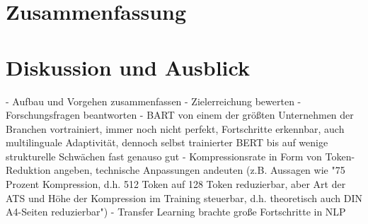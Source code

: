 \chapter{Zusammenfassung}
\thispagestyle{fancy}
\label{chap:Zusammenfassung}

\chapter{Diskussion und Ausblick}
\thispagestyle{fancy}
\label{chap:Diskussion und Ausblick}

- Aufbau und Vorgehen zusammenfassen
- Zielerreichung bewerten
- Forschungsfragen beantworten
- BART von einem der größten Unternehmen der Branchen vortrainiert, immer noch nicht perfekt, Fortschritte erkennbar, auch multilinguale Adaptivität, dennoch selbst trainierter BERT bis auf wenige strukturelle Schwächen fast genauso gut
- Kompressionsrate in Form von Token-Reduktion angeben, technische Anpassungen andeuten (z.B. Aussagen wie "75 Prozent Kompression, d.h. 512 Token auf 128 Token reduzierbar, aber Art der ATS und Höhe der Kompression im Training steuerbar, d.h. theoretisch auch DIN A4-Seiten reduzierbar")
- Transfer Learning brachte große Fortschritte in NLP

